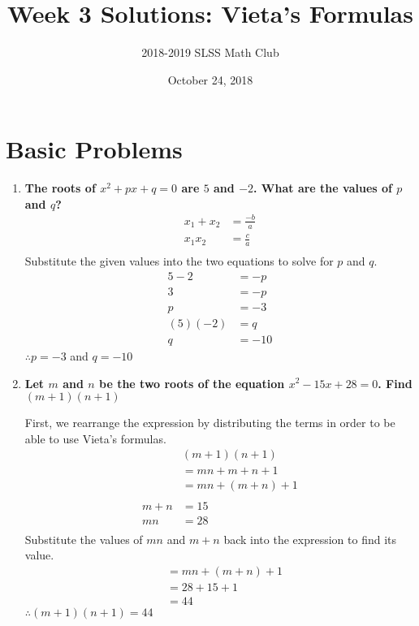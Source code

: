 \documentclass[12pt]{article}
\title{Week 3 Solutions: Vieta's Formulas\vspace{-3mm}}
\author{2018-2019 SLSS Math Club}
\date{\vspace{-3mm}October 24, 2018}
\begin{document}
\maketitle 

\section*{Basic Problems}
\begin{enumerate}
    \item \textbf{The roots of $x^2 + px + q = 0$ are $5$ and $-2$. What are the values of $p$ and $q$?}
    \begin{align*}
        x_1+x_2&=\frac{-b}{a} \\
        x_1x_2&=\frac{c}{a} \\
    \end{align*}
    Substitute the given values into the two equations to solve for $p$ and $q$.
    \begin{align*}
        5-2&=-p \\
        3&=-p \\
        p&=-3 \\
        (5)(-2)&=q \\
        q&=-10
    \end{align*}
    $\therefore p = -3$ and $q = -10$
    
    \item \textbf{Let $m$ and $n$ be the two roots of the equation $x^2 - 15x + 28 = 0$. Find $(m + 1)(n + 1)$}
    
    First, we rearrange the expression by distributing the terms in order to be able to use Vieta's formulas.
    \begin{align*}
        &(m+1)(n+1) \\
        &=mn+m+n+1 \\
        &=mn+(m+n)+1 \\ \\
        m+n&=15 \\
        mn&=28 \\
    \end{align*}
    Substitute the values of $mn$ and $m+n$ back into the expression to find its value.
    \begin{align*}
        &=mn+(m+n)+1 \\
        &=28+15+1 \\
        &=44
    \end{align*}
    $\therefore (m+1)(n+1)=44$
    
\end{enumerate}
\end{document}
